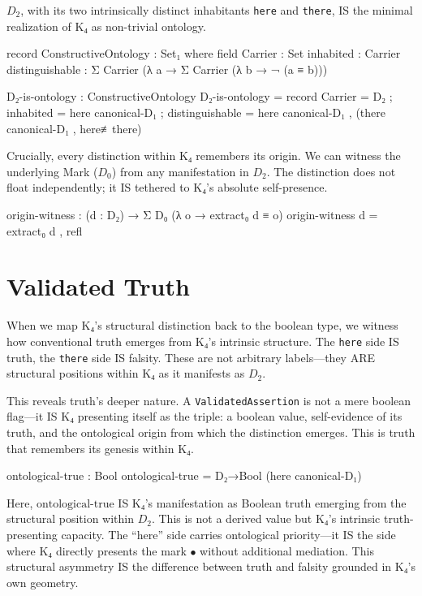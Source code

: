 \documentclass[11pt,a4paper]{book}
\begin{document}
$D_2$, with its two intrinsically distinct inhabitants \texttt{here} and \texttt{there}, IS the minimal realization of K₄ as non-trivial ontology.

\begin{code}
record ConstructiveOntology : Set₁ where
  field
    Carrier : Set
    inhabited : Carrier
    distinguishable : Σ Carrier (λ a → Σ Carrier (λ b → ¬ (a ≡ b)))

D₂-is-ontology : ConstructiveOntology
D₂-is-ontology = record
  { Carrier = D₂
  ; inhabited = here canonical-D₁
  ; distinguishable = here canonical-D₁ , (there canonical-D₁ , here≢there)
  }
\end{code}

Crucially, every distinction within K₄ remembers its origin. We can witness the underlying Mark ($D_0$) from any manifestation in $D_2$. The distinction does not float independently; it IS tethered to K₄'s absolute self-presence.

\begin{code}
origin-witness : (d : D₂) → Σ D₀ (λ o → extract₀ d ≡ o)
origin-witness d = extract₀ d , refl
\end{code}

\section{Validated Truth}

When we map K₄'s structural distinction back to the boolean type, we witness how conventional truth emerges from K₄'s intrinsic structure. The \texttt{here} side IS truth, the \texttt{there} side IS falsity. These are not arbitrary labels—they ARE structural positions within K₄ as it manifests as $D_2$.

This reveals truth's deeper nature. A \texttt{ValidatedAssertion} is not a mere boolean flag—it IS K₄ presenting itself as the triple: a boolean value, self-evidence of its truth, and the ontological origin from which the distinction emerges. This is truth that remembers its genesis within K₄.

\begin{code}
ontological-true : Bool
ontological-true = D₂→Bool (here canonical-D₁)
\end{code}

Here, $\text{ontological-true}$ IS K₄'s manifestation as Boolean truth emerging from the structural position within $D_2$. This is not a derived value but K₄'s intrinsic truth-presenting capacity. The ``here'' side carries ontological priority—it IS the side where K₄ directly presents the mark $\bullet$ without additional mediation. This structural asymmetry IS the difference between truth and falsity grounded in K₄'s own geometry.
\end{document}
